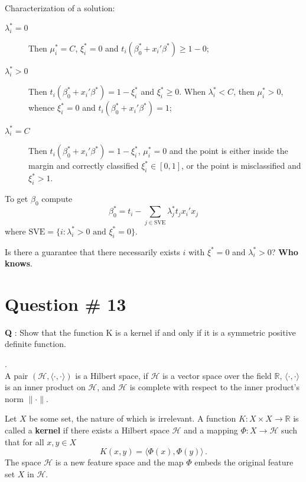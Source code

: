 \documentclass[a4paper]{article}
\newcommand{\Real}{\mathbb{R}}
\newcommand{\Hcal}{\mathcal{H}}
\begin{document}
Characterization of a solution:
\begin{description}
	\item[$\lambda^*_i = 0$] Then $\mu^*_i = C$, $\xi^*_i = 0$ and $t_i ( \beta^*_0 + x_i'\beta^* ) \geq 1 - 0$;
	\item[$\lambda^*_i > 0$] Then $t_i ( \beta^*_0 + x_i'\beta^* ) = 1 - \xi^*_i$ and $\xi^*_i \geq 0$.
		When $\lambda^*_i < C$, then $\mu^*_i > 0$, whence $\xi^*_i = 0$ and $t_i ( \beta^*_0 + x_i'\beta^* ) = 1$;
	\item[$\lambda^*_i = C$] Then $t_i ( \beta^*_0 + x_i'\beta^* ) = 1 - \xi^*_i$,
	$\mu^*_i=0$ and the point is either inside the margin and correctly classified
	$\xi^*_i \in [0,1]$, or the point is misclassified and $\xi^*_i > 1$.
\end{description}
To get $\beta_0$ compute 
\[ \beta^*_0 = t_i - \sum_{j\in\text{SVE}} \lambda^*_j t_j x_i'x_j \]
where $\text{SVE} = \{i: \lambda^*_i > 0 \text{ and } \xi^*_i = 0 \}$.

Is there a guarantee that there necessarily exists $i$ with $\xi^* = 0$ and
$\lambda^*_i>0$? \textbf{Who knows}.


\clearpage

\section{Question \# 13} %
\label{sec:question_13}
\textbf{\large \textbf{Q}} : Show that the function K is a kernel if and only if
it is a symmetric positive definite function.

 .\hfill\\
A pair $(\Hcal, \langle\cdot,\cdot\rangle)$ is a Hilbert space, if  $\Hcal$ is a
vector space over the field $\Real$, $\langle\cdot,\cdot\rangle$ is an inner product
on $\Hcal$, and $\Hcal$ is complete with respect to the inner product's norm $\|\cdot\|$.

Let $X$ be some set, the nature of which is irrelevant. A function $K:X\times X\to \Real$
is called a \textbf{kernel} if there exists a Hilbert space $\Hcal$ and a mapping
$\Phi : X \to \Hcal$ such that for all $x,y\in X$
\[ K(x,y) = \bigl\langle \Phi(x), \Phi(y) \bigr\rangle \,. \]
The space $\Hcal$ is a new feature space and the map $\Phi$ embeds the original
feature set $X$ in $\Hcal$.
\end{document}
